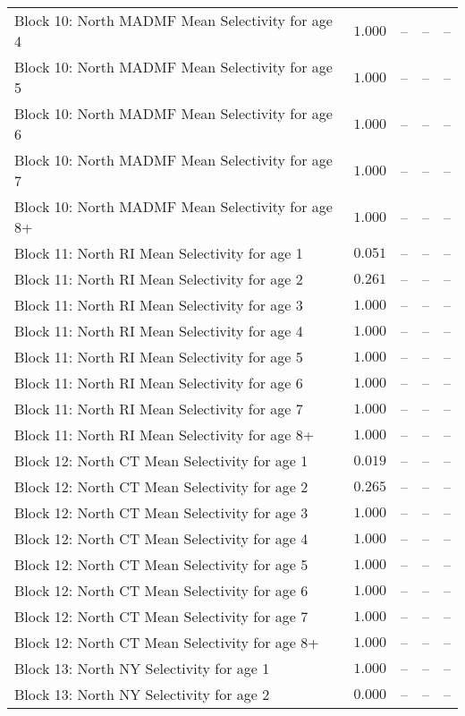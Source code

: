 \documentclass[
]{article}
\begin{document}
\begin{landscape}
\begin{longtable}[t]{lrrrr}
Block 10: North MADMF Mean Selectivity for age 4 & $1.000$ & -- & -- & --\\
Block 10: North MADMF Mean Selectivity for age 5 & $1.000$ & -- & -- & --\\
Block 10: North MADMF Mean Selectivity for age 6 & $1.000$ & -- & -- & --\\
\addlinespace
Block 10: North MADMF Mean Selectivity for age 7 & $1.000$ & -- & -- & --\\
Block 10: North MADMF Mean Selectivity for age 8+ & $1.000$ & -- & -- & --\\
Block 11: North RI Mean Selectivity for age 1 & $0.051$ & -- & -- & --\\
Block 11: North RI Mean Selectivity for age 2 & $0.261$ & -- & -- & --\\
Block 11: North RI Mean Selectivity for age 3 & $1.000$ & -- & -- & --\\
\addlinespace
Block 11: North RI Mean Selectivity for age 4 & $1.000$ & -- & -- & --\\
Block 11: North RI Mean Selectivity for age 5 & $1.000$ & -- & -- & --\\
Block 11: North RI Mean Selectivity for age 6 & $1.000$ & -- & -- & --\\
Block 11: North RI Mean Selectivity for age 7 & $1.000$ & -- & -- & --\\
Block 11: North RI Mean Selectivity for age 8+ & $1.000$ & -- & -- & --\\
\addlinespace
Block 12: North CT Mean Selectivity for age 1 & $0.019$ & -- & -- & --\\
Block 12: North CT Mean Selectivity for age 2 & $0.265$ & -- & -- & --\\
Block 12: North CT Mean Selectivity for age 3 & $1.000$ & -- & -- & --\\
Block 12: North CT Mean Selectivity for age 4 & $1.000$ & -- & -- & --\\
Block 12: North CT Mean Selectivity for age 5 & $1.000$ & -- & -- & --\\
\addlinespace
Block 12: North CT Mean Selectivity for age 6 & $1.000$ & -- & -- & --\\
Block 12: North CT Mean Selectivity for age 7 & $1.000$ & -- & -- & --\\
Block 12: North CT Mean Selectivity for age 8+ & $1.000$ & -- & -- & --\\
Block 13: North NY Selectivity for age 1 & $1.000$ & -- & -- & --\\
Block 13: North NY Selectivity for age 2 & $0.000$ & -- & -- & --\\

\end{longtable}
\end{landscape}
\end{document}
